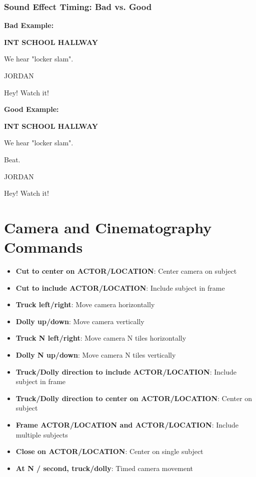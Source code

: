 \documentclass[11pt,letterpaper,oldstylefigures]{memoir}
\newcommand{\slugline}[1]{\nobreak\textbf{\MakeUppercase{#1}}\par\nobreak\vspace{1\baselineskip}}
\newcommand{\speaker}[1]{\nobreak\hspace*{0.333\textwidth}\MakeUppercase{#1}\par\nobreak\vspace{0.5\baselineskip}}
\newcommand{\dialogue}[1]{\nobreak\hspace*{0.25\textwidth}\begin{minipage}{0.5\textwidth}#1\end{minipage}\par\vspace{1\baselineskip}}
\newcommand{\stagedir}[1]{#1\par\vspace{1\baselineskip}}
\newenvironment{FountainExample}
  {\begingroup
  \ttfamily\small
   \setlength{\parindent}{0pt}
  \setlength{\parskip}{0.5em}
  \allowdisplaybreaks
  \setlength{\displaywidowpenalty}{0}
  \setlength{\widowpenalty}{0}
  \setlength{\clubpenalty}{0}
  \setlength{\interlinepenalty}{0}
}
  {\endgroup}
\newcommand{\fountain}[1]{\textbf{#1}}
\begin{document}
\subsubsection*{Sound Effect Timing: Bad vs. Good}
\label{ex:sound-timing-bad-good}

\textbf{Bad Example:}
\begin{FountainExample}
\slugline{INT SCHOOL HALLWAY}

\stagedir{We hear "locker slam".}
\speaker{JORDAN}
\dialogue{Hey! Watch it!}
\end{FountainExample}

\textbf{Good Example:}
\begin{FountainExample}
\slugline{INT SCHOOL HALLWAY}

\stagedir{We hear "locker slam".}
\stagedir{Beat.}
\speaker{JORDAN}
\dialogue{Hey! Watch it!}
\end{FountainExample}

\section{Camera and Cinematography Commands}
\begin{itemize}
\item \fountain{Cut to center on ACTOR/LOCATION}: Center camera on subject
\item \fountain{Cut to include ACTOR/LOCATION}: Include subject in frame
\item \fountain{Truck left/right}: Move camera horizontally
\item \fountain{Dolly up/down}: Move camera vertically
\item \fountain{Truck N left/right}: Move camera N tiles horizontally
\item \fountain{Dolly N up/down}: Move camera N tiles vertically
\item \fountain{Truck/Dolly direction to include ACTOR/LOCATION}: Include subject in frame
\item \fountain{Truck/Dolly direction to center on ACTOR/LOCATION}: Center on subject
\item \fountain{Frame ACTOR/LOCATION and ACTOR/LOCATION}: Include multiple subjects
\item \fountain{Close on ACTOR/LOCATION}: Center on single subject
\item \fountain{At N / second, truck/dolly}: Timed camera movement
\end{itemize}
\end{document}
